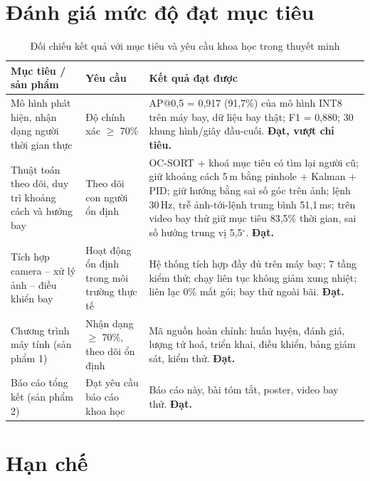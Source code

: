 \section{Đánh giá mức độ đạt mục tiêu}

\begin{table}[H]
\centering
\caption{Đối chiếu kết quả với mục tiêu và yêu cầu khoa học trong thuyết minh}
\label{tab:danhgiamuctieu}
\small
\renewcommand{\arraystretch}{1.18}
\begin{tabularx}{\textwidth}{@{}>{\raggedright\arraybackslash}p{3.7cm}>{\raggedright\arraybackslash}p{2.9cm}>{\raggedright\arraybackslash}X@{}}
\toprule
\textbf{Mục tiêu / sản phẩm} & \textbf{Yêu cầu} & \textbf{Kết quả đạt được}\\
\midrule
Mô hình phát hiện, nhận dạng người thời gian thực & Độ chính xác $\ge$ 70\% & AP@0,5 = 0,917 (91,7\%) của mô hình INT8 trên máy bay, dữ liệu bay thật; F1 = 0,880; 30 khung hình/giây đầu-cuối. \textbf{Đạt, vượt chỉ tiêu.}\\
Thuật toán theo dõi, duy trì khoảng cách và hướng bay & Theo dõi con người ổn định & OC-SORT + khoá mục tiêu có tìm lại người cũ; giữ khoảng cách 5\,m bằng pinhole + Kalman + PID; giữ hướng bằng sai số góc trên ảnh; lệnh 30\,Hz, trễ ảnh-tới-lệnh trung bình 51,1\,ms; trên video bay thử giữ mục tiêu 83,5\% thời gian, sai số hướng trung vị 5,5$^\circ$. \textbf{Đạt.}\\
Tích hợp camera -- xử lý ảnh -- điều khiển bay & Hoạt động ổn định trong môi trường thực tế & Hệ thống tích hợp đầy đủ trên máy bay; 7 tầng kiểm thử; chạy liên tục không giảm xung nhiệt; liên lạc 0\% mất gói; bay thử ngoài bãi. \textbf{Đạt.}\\
Chương trình máy tính (sản phẩm 1) & Nhận dạng $\ge$ 70\%, theo dõi ổn định & Mã nguồn hoàn chỉnh: huấn luyện, đánh giá, lượng tử hoá, triển khai, điều khiển, bảng giám sát, kiểm thử. \textbf{Đạt.}\\
Báo cáo tổng kết (sản phẩm 2) & Đạt yêu cầu báo cáo khoa học & Báo cáo này, bài tóm tắt, poster, video bay thử. \textbf{Đạt.}\\
\bottomrule
\end{tabularx}
\end{table}

\section{Hạn chế}

